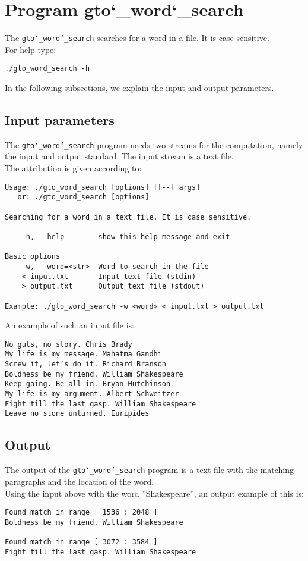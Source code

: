 \section{Program gto\char`_word\char`_search}
The \texttt{gto\char`_word\char`_search} searches for a word in a file. It is case sensitive.\\
For help type:
\begin{lstlisting}
./gto_word_search -h
\end{lstlisting}
In the following subsections, we explain the input and output parameters.

\subsection*{Input parameters}

The \texttt{gto\char`_word\char`_search} program needs two streams for the computation, namely the input and output standard. The input stream is a text file.\\
The attribution is given according to:
\begin{lstlisting}
Usage: ./gto_word_search [options] [[--] args]
   or: ./gto_word_search [options]

Searching for a word in a text file. It is case sensitive.

    -h, --help        show this help message and exit

Basic options
    -w, --word=<str>  Word to search in the file
    < input.txt       Input text file (stdin)
    > output.txt      Output text file (stdout)

Example: ./gto_word_search -w <word> < input.txt > output.txt
\end{lstlisting}
An example of such an input file is:
\begin{lstlisting}
No guts, no story. Chris Brady
My life is my message. Mahatma Gandhi
Screw it, let’s do it. Richard Branson
Boldness be my friend. William Shakespeare
Keep going. Be all in. Bryan Hutchinson
My life is my argument. Albert Schweitzer
Fight till the last gasp. William Shakespeare
Leave no stone unturned. Euripides
\end{lstlisting}

\subsection*{Output}
The output of the \texttt{gto\char`_word\char`_search} program is a text file with the matching paragraphs and the location of the word.\\
Using the input above with the word ''Shakespeare'', an output example of this is:
\begin{lstlisting}
Found match in range [ 1536 : 2048 ]
Boldness be my friend. William Shakespeare

Found match in range [ 3072 : 3584 ]
Fight till the last gasp. William Shakespeare
\end{lstlisting}